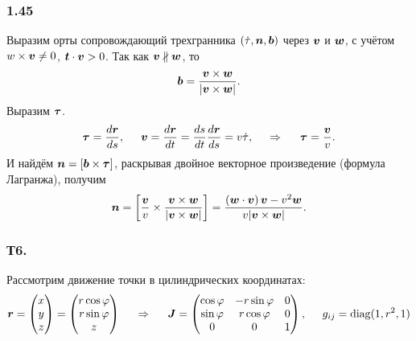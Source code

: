 \subsubsection*{1.45}
Выразим орты сопровождающий трехгранника $(\dot{\tau}, \mbox{\boldmath $n$}, \mbox{\boldmath $b$})$ через $\mbox{\boldmath $v$}$ и $\mbox{\boldmath $w$}$, с учётом $w \times \mbox{\boldmath $v$} \neq 0$, $\mbox{\boldmath $t$} \cdot \mbox{\boldmath $v$} > 0$.
Так как $\mbox{\boldmath $v$} \nparallel \mbox{\boldmath $w$}$, то
$$
    \mbox{\boldmath $b$} = \frac{\mbox{\boldmath $v$} \times \mbox{\boldmath $w$}}{|\mbox{\boldmath $v$} \times \mbox{\boldmath $w$}|}.
$$
Выразим $\mbox{\boldmath $\tau$}$.
$$
    \mbox{\boldmath $\tau$} = \frac{d \mbox{\boldmath $r$}}{d s}, \hspace{0.5cm} 
    \mbox{\boldmath $v$} = \frac{d \mbox{\boldmath $r$}}{d t} = \frac{ds}{dt} \frac{d \mbox{\boldmath $r$}}{ds} = v \dot{\tau},
    \hspace{0.5cm} \Rightarrow \hspace{0.5cm} 
    \mbox{\boldmath $\tau$} = \frac{\mbox{\boldmath $v$}}{v}.
$$
И найдём $\mbox{\boldmath $n$} = [\mbox{\boldmath $b$} \times \mbox{\boldmath $\tau$}]$, раскрывая двойное векторное произведение (формула Лагранжа), получим
$$
    \mbox{\boldmath $n$} = \left[\frac{\mbox{\boldmath $v$}}{v} \times \frac{\mbox{\boldmath $v$} \times \mbox{\boldmath $w$}}{|\mbox{\boldmath $v$} \times \mbox{\boldmath $w$}|}\right]=
    \frac{\left(\mbox{\boldmath $w$} \cdot \mbox{\boldmath $v$}\right)\mbox{\boldmath $v$} - v^2 \mbox{\boldmath $w$}}{v |\mbox{\boldmath $v$} \times \mbox{\boldmath $w$}|} .
$$

\subsubsection*{Т6.}

Рассмотрим движение точки в цилиндрических координатах:
$$
    \mbox{\boldmath $r$} = \begin{pmatrix}
        x \\ y \\ z  
    \end{pmatrix} = \begin{pmatrix}
        r \cos \varphi \\ r \sin \varphi \\ z
    \end{pmatrix}
    \hspace{0.5cm} \Rightarrow \hspace{0.5cm} 
    \mbox{\boldmath $J$} = \begin{pmatrix}
        \cos \varphi & - r \sin \varphi & 0 \\
        \sin \varphi & r \cos \varphi & 0 \\
        0 & 0 & 1
    \end{pmatrix}, \hspace{0.5cm} 
    g_{ij} = \mathop{\mathrm{diag}}\nolimits(1, r^2, 1)
$$

